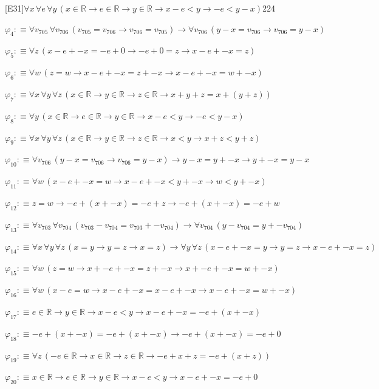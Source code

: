 \begin{fullproof}{[E31]}{$\forall x\,\forall e\,\forall y\,(x \in \mathbb{R} \to e \in \mathbb{R} \to y \in \mathbb{R} \to x - e < y \to -e < y - x)$}{224}
\begin{abbrevlist}
\item $\varphi_{4} :\equiv \forall v_{705}\,\forall v_{706}\,(v_{705} = v_{706} \to v_{706} = v_{705}) \to \forall v_{706}\,(y - x = v_{706} \to v_{706} = y - x)$
\item $\varphi_{5} :\equiv \forall z\,(x - e + -x = -e + 0 \to -e + 0 = z \to x - e + -x = z)$
\item $\varphi_{6} :\equiv \forall w\,(z = w \to x - e + -x = z + -x \to x - e + -x = w + -x)$
\item $\varphi_{7} :\equiv \forall x\,\forall y\,\forall z\,(x \in \mathbb{R} \to y \in \mathbb{R} \to z \in \mathbb{R} \to x + y + z = x + (y + z))$
\item $\varphi_{8} :\equiv \forall y\,(x \in \mathbb{R} \to e \in \mathbb{R} \to y \in \mathbb{R} \to x - e < y \to -e < y - x)$
\item $\varphi_{9} :\equiv \forall x\,\forall y\,\forall z\,(x \in \mathbb{R} \to y \in \mathbb{R} \to z \in \mathbb{R} \to x < y \to x + z < y + z)$
\item $\varphi_{10} :\equiv \forall v_{706}\,(y - x = v_{706} \to v_{706} = y - x) \to y - x = y + -x \to y + -x = y - x$
\item $\varphi_{11} :\equiv \forall w\,(x - e + -x = w \to x - e + -x < y + -x \to w < y + -x)$
\item $\varphi_{12} :\equiv z = w \to -e + (x + -x) = -e + z \to -e + (x + -x) = -e + w$
\item $\varphi_{13} :\equiv \forall v_{703}\,\forall v_{704}\,(v_{703} - v_{704} = v_{703} + -v_{704}) \to \forall v_{704}\,(y - v_{704} = y + -v_{704})$
\item $\varphi_{14} :\equiv \forall x\,\forall y\,\forall z\,(x = y \to y = z \to x = z) \to \forall y\,\forall z\,(x - e + -x = y \to y = z \to x - e + -x = z)$
\item $\varphi_{15} :\equiv \forall w\,(z = w \to x + -e + -x = z + -x \to x + -e + -x = w + -x)$
\item $\varphi_{16} :\equiv \forall w\,(x - e = w \to x - e + -x = x - e + -x \to x - e + -x = w + -x)$
\item $\varphi_{17} :\equiv e \in \mathbb{R} \to y \in \mathbb{R} \to x - e < y \to x - e + -x = -e + (x + -x)$
\item $\varphi_{18} :\equiv -e + (x + -x) = -e + (x + -x) \to -e + (x + -x) = -e + 0$
\item $\varphi_{19} :\equiv \forall z\,(-e \in \mathbb{R} \to x \in \mathbb{R} \to z \in \mathbb{R} \to -e + x + z = -e + (x + z))$
\item $\varphi_{20} :\equiv x \in \mathbb{R} \to e \in \mathbb{R} \to y \in \mathbb{R} \to x - e < y \to x - e + -x = -e + 0$

\end{abbrevlist}
\end{fullproof}
